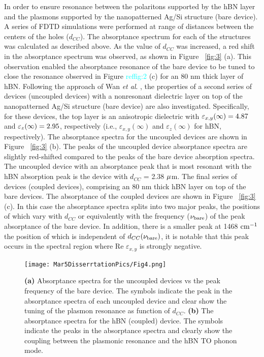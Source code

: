 \documentclass[
peprint,
amsmath,amssymb,
aip,
jap,
floatfix,
]{revtex4-2}
\begin{document}
    In order to ensure resonance between the polaritons supported by the hBN layer and the plasmons supported by the nanopatterned Ag/Si structure (bare device). A series of FDTD simulations were performed at range of distances between the centers of the holes ($d_{CC}$). The absorptance spectrum for each of the structures was calculated as described above. As the value of $d_{CC}$ was increased, a red shift in the absorptance spectrum was observed, as shown in Figure ~\ref{fig:3} (a). This observation enabled the absorptance resonance of the bare device to be tuned to close the resonance observed in Figure \textcolor{cyan}{ref{fig:2}} (c) for an 80 nm thick layer of hBN. Following the approach of Wan \textit{et al}. \cite{Wan:16}, the properties of a second series of devices (uncoupled devices) with a nonresonant dielectric layer on top of the nanopatterned Ag/Si structure (bare device) are also investigated. Specifically, for these devices, the top layer is an anisotropic dielectric with $\varepsilon_{x,y}(\infty)= \rm{4.87}$ and $\varepsilon_{z}(\infty)= \rm{2.95}$, respectively (i.e., $\varepsilon_{x,y}(\infty)$ and $\varepsilon_{z}(\infty)$ for hBN, respectively). The absorptance spectra for the uncoupled devices are shown in Figure ~\ref{fig:3} (b). The peaks of the uncoupled device absorptance spectra are slightly red-shifted compared to the peaks of the bare device absorption spectra. The uncoupled device with an absorptance peak that is most resonant with the hBN absorption peak is the device with $d_{CC}$ = 2.38 $\rm \mu$m. The final series of devices (coupled devices), comprising an 80 nm thick hBN layer on top of the bare devices. The absorptance of the coupled devices are shown in Figure  ~\ref{fig:3} (c). In this case the absorptance spectra splits into two major peaks, the positions of which vary with $d_{CC}$ or equivalently with the frequency ($\nu_{\rm{bare}}$) of the peak absorptance of the bare device. In addition, there is a smaller peak at 1468 $\rm cm^{-1}$ the position of which is independent of $d_{CC}(\nu_{\rm{bare}})$, it is notable that this peak occurs in the spectral region where Re $\varepsilon_{x,y}$ is strongly negative.


      \begin{figure}[!htb]
        \centering\texttt{[image: Mar5DisserrtationPics/Fig4.png]}
        \caption{\textbf{(a)} Absorptance spectra for the uncoupled devices vs the peak frequency of the bare device. The symbols indicate the peak in the absorptance spectra of each uncoupled device and clear show the tuning of the plasmon resonance as function of $d_{CC}$. \textbf{(b)} The absorptance spectra for the hBN (coupled) device. The symbols indicate the peaks in the absorptance spectra and clearly show the coupling between the plasmonic resonance and the hBN TO phonon mode.}
        \label{fig:4}
      \end{figure}
\end{document}
